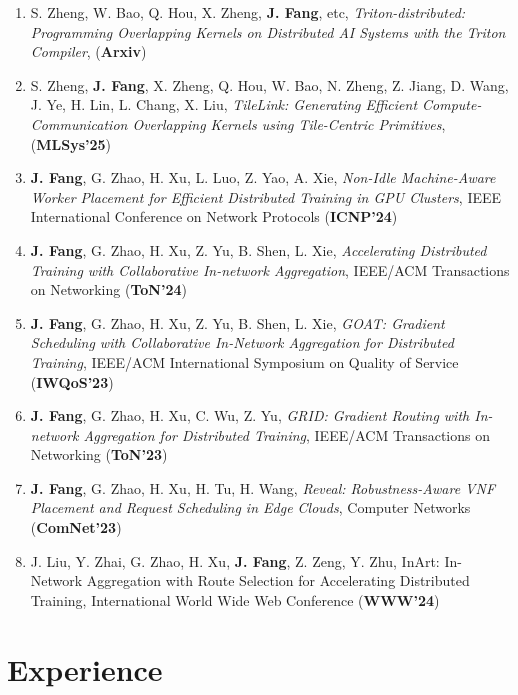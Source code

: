 \documentclass{resume}
\begin{document}
\begin{enumerate}

  \item S. Zheng, W. Bao, Q. Hou, X. Zheng, \textbf{J. Fang}, etc, \textit{Triton-distributed: Programming Overlapping Kernels on Distributed AI Systems with the Triton Compiler},  (\textbf{Arxiv})
  \item S. Zheng, \textbf{J. Fang}, X. Zheng, Q. Hou, W. Bao, N. Zheng, Z. Jiang, D. Wang, J. Ye, H. Lin, L. Chang, X. Liu, \textit{TileLink: Generating Efficient Compute-Communication Overlapping Kernels using Tile-Centric Primitives}, (\textbf{MLSys'25})
  \item \textbf{J. Fang}, G. Zhao, H. Xu, L. Luo, Z. Yao, A. Xie, \textit{Non-Idle Machine-Aware Worker Placement for Efficient Distributed Training in GPU Clusters}, IEEE International Conference on Network Protocols (\textbf{ICNP'24})
  \item \textbf{J. Fang}, G. Zhao, H. Xu, Z. Yu, B. Shen, L. Xie, \textit{Accelerating Distributed Training with Collaborative In-network Aggregation}, IEEE/ACM Transactions on Networking (\textbf{ToN'24})
  \item \textbf{J. Fang}, G. Zhao, H. Xu, Z. Yu, B. Shen, L. Xie, \textit{GOAT: Gradient Scheduling with Collaborative In-Network Aggregation for Distributed Training}, IEEE/ACM International Symposium on Quality of Service (\textbf{IWQoS'23})
  \item \textbf{J. Fang}, G. Zhao, H. Xu, C. Wu, Z. Yu, \textit{GRID: Gradient Routing with In-network Aggregation for Distributed Training}, IEEE/ACM Transactions on Networking (\textbf{ToN'23})
  \item \textbf{J. Fang}, G. Zhao, H. Xu, H. Tu, H. Wang, \textit{Reveal: Robustness-Aware VNF Placement and Request Scheduling in Edge Clouds}, Computer Networks (\textbf{ComNet'23})
  \item J. Liu, Y. Zhai, G. Zhao, H. Xu, \textbf{J. Fang}, Z. Zeng, Y. Zhu, InArt: In-Network Aggregation with Route
  Selection for Accelerating Distributed Training, International World Wide Web Conference (\textbf{WWW'24})
\end{enumerate}

\section{Experience}
\end{document}
